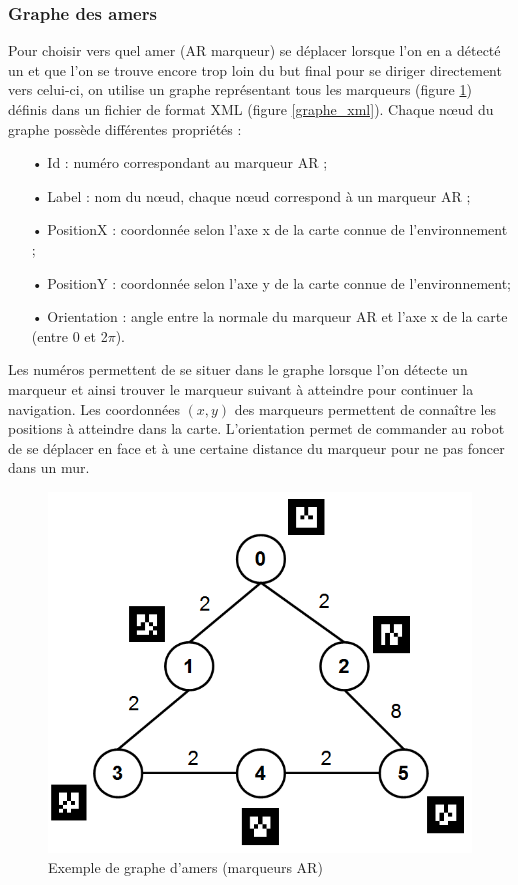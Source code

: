 \documentclass[10pt,a4paper]{article}
\begin{document}
\subsubsection{Graphe des amers}
\label{sec:grapheDesAmers}

Pour choisir vers quel amer (AR marqueur) se déplacer lorsque l'on en a détecté un et que l'on se trouve encore trop loin du but final pour se diriger directement vers celui-ci, on utilise un graphe représentant tous les marqueurs (figure \ref{graphe}) définis dans un fichier de format XML (figure \ref{graphe_xml}). Chaque nœud du graphe possède différentes propriétés : 

\begin{itemize}
\item[•] Id : numéro correspondant au marqueur AR ; 
\item[•] Label : nom du nœud, chaque nœud correspond à un marqueur AR ; 
\item[•] PositionX : coordonnée selon l'axe x de la carte connue de l'environnement ; 
\item[•] PositionY : coordonnée selon l'axe y de la carte connue de l'environnement; 
\item[•] Orientation : angle entre la normale du marqueur AR et l'axe x de la carte (entre 0 et 2$\pi$).
\end{itemize}

Les numéros permettent de se situer dans le graphe lorsque l'on détecte un marqueur et ainsi trouver le marqueur suivant à atteindre pour continuer la navigation. Les coordonnées $(x,y)$ des marqueurs permettent de connaître les positions à atteindre dans la carte. L'orientation permet de commander au robot de se déplacer en face et à une certaine distance du marqueur pour ne pas foncer dans un mur.

\begin{figure}[!h]
\centering\includegraphics[scale=0.4]{figures/graphe.png}
\caption{Exemple de graphe d'amers (marqueurs AR)}
\label{graphe}
\end{figure}
\end{document}
